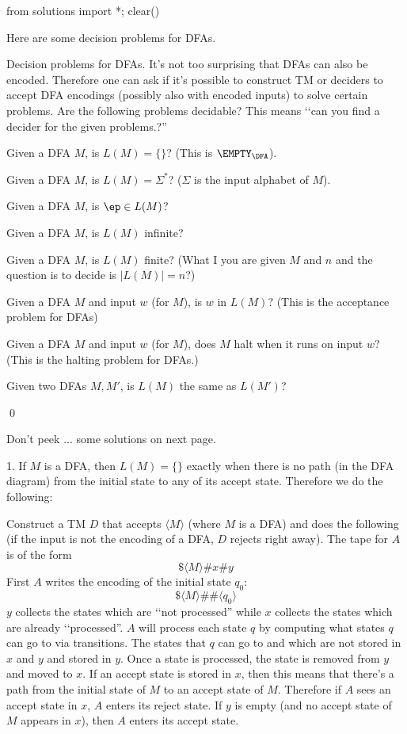 \begin{python0}
from solutions import *; clear()
\end{python0}

Here are some decision problems for DFAs.

\begin{ex}
  Decision problems for DFAs.
  It's not too surprising that DFAs can also be encoded.
  Therefore one can ask if it's possible to construct TM or deciders
  to accept DFA encodings (possibly also with encoded  inputs) to
  solve certain problems.
  Are the following problems decidable?
  This means \lq\lq can you find a decider for the given problems.?''
  \begin{tightlist}
    \item Given a DFA $M$, is $L(M) = \{\}$?
    (This is $\EMPTY_\DFA$).
    \item Given a DFA $M$, is $L(M) = \Sigma^*$? ($\Sigma$ is the
    input alphabet of $M$).
    \item Given a DFA $M$, is $\ep \in L(M)$?
    \item Given a DFA $M$, is $L(M)$ infinite?
    \item Given a DFA $M$, is $L(M)$ finite? (What I you are given $M$ and $n$
      and the question is to decide is $|L(M)| = n$?)
    \item Given a DFA $M$ and input $w$ (for $M$), is $w$ in $L(M)$?
    (This is the acceptance problem for DFAs)
    \item Given a DFA $M$ and input $w$ (for $M$), does $M$ halt when
    it runs on input $w$?
    (This is the halting problem for DFAs.)
    \item Given two DFAs $M, M'$, is $L(M)$ the same as $L(M')$?
  \end{tightlist}
  \qed
\end{ex}

Don't peek ... some solutions on next page.

\newpage
\SOLUTION

1.
If $M$ is a DFA, then $L(M) = \{\}$ exactly when there is no
path (in the DFA diagram) from the initial state to any of its
accept state. Therefore we do the following:

Construct a TM $D$ that accepts $\langle M \rangle$
(where $M$ is a DFA) and does the following
(if the input is not the encoding of a DFA, $D$ rejects right away).
The tape for $A$ is of the form
\[
\$ \langle M \rangle \# x \# y
\]
First $A$ writes the encoding of the initial state $q_0$:
\[
\$ \langle M \rangle \# \# \langle q_0 \rangle
\]
$y$ collects the states which are \lq\lq not processed''
while $x$ collects the states which are already \lq\lq processed''.
$A$ will process each state $q$ by computing what states
$q$ can go to via transitions.
The states that $q$ can go to and which are not stored in $x$ and $y$
and stored in $y$.
Once a state is processed, the state is removed from $y$ and
moved to $x$.
If an accept state is stored in $x$, then this means that
there's a path from the initial state of $M$ to 
an accept state of $M$.
Therefore if $A$ sees an accept state in $x$, $A$ enters its reject state.
If $y$ is empty (and no accept state of $M$ appears in $x$),
then $A$ enters its accept state.

